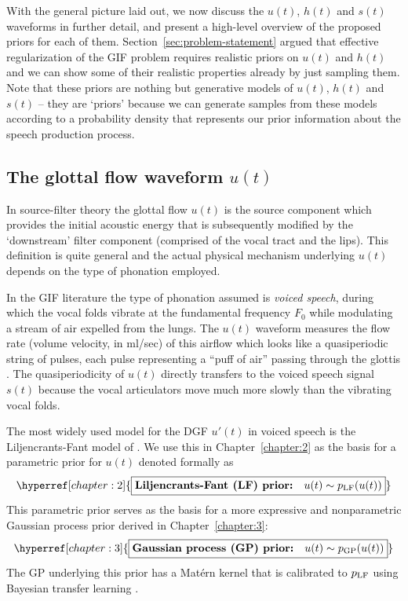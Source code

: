 \begin{chaptersections}
With the general picture laid out, we now discuss the $u(t)$, $h(t)$ and $s(t)$ waveforms in further detail, and present a high-level overview of the proposed priors for each of them.
Section~\ref{sec:problem-statement} argued that effective regularization of the GIF problem requires realistic priors on $u(t)$ and $h(t)$ and we can show some of their realistic properties already by just sampling them.
Note that these priors are nothing but generative models of $u(t)$, $h(t)$ and $s(t)$ -- they are `priors' because we can generate samples from these models according to a probability density that represents our prior information about the speech production process.

\subsection{The glottal flow waveform $u(t)$}

In source-filter theory the glottal flow $u(t)$ is the source component which provides the initial acoustic energy that is subsequently modified by the `downstream' filter component (comprised of the vocal tract and the lips).
This definition is quite general and the actual physical mechanism underlying $u(t)$ depends on the type of phonation employed.

In the GIF literature the type of phonation assumed is \emph{voiced speech}, during which the vocal folds vibrate at the fundamental frequency $F_0$ while modulating a stream of air expelled from the lungs.
The $u(t)$ waveform measures the flow rate (volume velocity, in ml/sec) of this airflow which looks like a quasiperiodic string of pulses, each pulse representing a ``puff of air'' passing through the glottis \citep{Schroeder1999}.
The quasiperiodicity of $u(t)$ directly transfers to the voiced speech signal $s(t)$ because the vocal articulators move much more slowly than the vibrating vocal folds.


The most widely used model for the DGF $u'(t)$ in voiced speech is the Liljencrants-Fant model of \cite{Fant1985}.
We use this in Chapter~\ref{chapter:2} as the basis for a parametric prior for $u(t)$ denoted formally as
\begin{equation}
    \hyperref[chapter:2]{\boxed{\textbf{Liljencrants-Fant (LF) prior:} \quad u(t) \sim \piLF(u(t))}} \label{eq:lfprior}
\end{equation}
This parametric prior serves as the basis for a more expressive and nonparametric Gaussian process prior derived in Chapter~\ref{chapter:3}:
\begin{equation}
    \hyperref[chapter:3]{\boxed{\textbf{Gaussian process (GP) prior:} \quad u(t) \sim \piGP(u(t))}} \label{eq:gpprior}
\end{equation}
The GP underlying this prior has a Matérn kernel that is calibrated to $p_{\text{LF}}$ using Bayesian transfer learning \citep{Xuan2021}.


\end{chaptersections}
